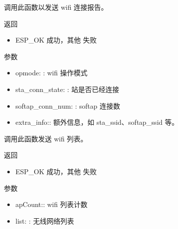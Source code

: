 \documentclass[a4paper,12pt,english]{sphinxmanual}
\begin{document}
{{\sphinxAtStartPar
调用此函数以发送 wifi 连接报告。

\sphinxAtStartPar
返回
\begin{itemize}
\item {} 
\sphinxAtStartPar
ESP\_OK \sphinxhyphen{} 成功，其他 \sphinxhyphen{} 失败

\end{itemize}

\sphinxAtStartPar
参数
\begin{itemize}
\item {} 
\sphinxAtStartPar
opmode: : wifi 操作模式

\item {} 
\sphinxAtStartPar
sta\_conn\_state: : 站是否已经连接

\item {} 
\sphinxAtStartPar
softap\_conn\_num: : softap 连接数

\item {} 
\sphinxAtStartPar
extra\_info:: 额外信息，如 sta\_ssid、softap\_ssid 等。

\end{itemize}

\begin{sphinxVerbatim}[commandchars=\\\{\}]
\end{sphinxVerbatim}

\sphinxAtStartPar
调用此函数发送 wifi 列表。

\sphinxAtStartPar
返回
\begin{itemize}
\item {} 
\sphinxAtStartPar
ESP\_OK \sphinxhyphen{} 成功，其他 \sphinxhyphen{} 失败

\end{itemize}

\sphinxAtStartPar
参数
\begin{itemize}
\item {} 
\sphinxAtStartPar
apCount:: wifi 列表计数

\item {} 
\sphinxAtStartPar
list: : 无线网络列表

\end{itemize}

}}
\end{document}
